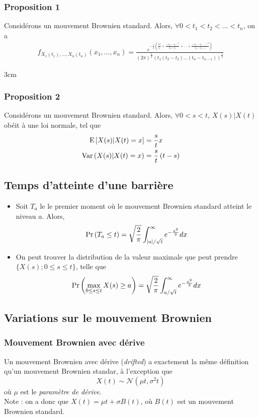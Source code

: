 \documentclass[10pt, french]{article}
\begin{document}
\begin{multicols*}{2}
\subsubsection*{Proposition 1}
Considérons un mouvement Brownien standard. Alors, $\forall 0 < t_1 < t_2 < ... < t_{n}$, on a
\begin{align*}
f_{X_1(t_1), ..., X_n(t_n)}(x_1, ..., x_n) = \frac{e^{-\frac{1}{2} \left(\frac{x_1^2}{t_1} + \frac{(x_2 - x_1)^2}{t_2 - t_1} + ... + \frac{(x_n - x_{n-1})^2}{t_n - t_{n-1}} \right)}}{(2 \pi)^{\frac{n}{2}} (t_1 (t_2 - t_2) ... (t_n - t_{n-1}))^{\frac{1}{2}}} 
\end{align*}

\vfill{3cm}

\subsubsection*{Proposition 2}
Considérons un mouvement Brownien standard. Alors, $\forall 0 < s < t$, $X(s) | X(t)$ obéit à une loi normale, tel que
\begin{align*}
\mathrm{E} \left[ X(s) | X(t) = x \right]&  = \frac{s}{t} x \\
\mathrm{Var} \left( X(s) |X(t) = x \right) & = \frac{s}{t} \left( t - s \right) \\
\end{align*}

\subsection*{Temps d'atteinte d'une barrière}
\begin{itemize}
\item Soit $T_a$ le le premier moment où le mouvement Brownien standard atteint le niveau $a$. Alors,
\[\Pr \left( T_a \leq t \right) = \sqrt{\frac{2}{\pi}} \int_{|a| / \sqrt{t}}^{\infty} e^{- \frac{x^2}{2}} dx   \]

\item On peut trouver la distribution de la valeur maximale que peut prendre $\{ X(s) ; 0 \leq s \leq t \}$, telle que
\[\Pr \left( \max_{0 \leq s \leq t} X(s) \geq a \right) =  \sqrt{\frac{2}{\pi}} \int_{a / \sqrt{t}}^{\infty} e^{- \frac{x^2}{2}} dx\]
\end{itemize}


\subsection*{Variations sur le mouvement Brownien}
\subsubsection*{Mouvement Brownien avec dérive}
Un mouvement Brownien avec dérive (\emph{drifted}) a exactement la même définition qu'un mouvement Brownien standar, à l'exception que
\[X(t) \sim \mathcal{N} \left(\mu t, \sigma^2 t \right) \]
où $\mu$ est le \emph{paramètre de dérive}.\\
 Note : on a donc que $X(t) = \mu t + \sigma B(t)$, où $B(t)$ est un mouvement Brownien standard.


\end{multicols*}
\end{document}
